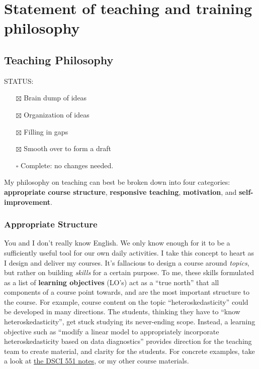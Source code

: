\documentclass[]{article}
\providecommand{\tightlist}{%
  \setlength{\itemsep}{0pt}\setlength{\parskip}{0pt}}
\begin{document}
\hypertarget{statement-of-teaching-and-training-philosophy}{%
\section{Statement of teaching and training philosophy}\label{statement-of-teaching-and-training-philosophy}}

\hypertarget{teaching-philosophy}{%
\subsection{Teaching Philosophy}\label{teaching-philosophy}}

STATUS:

\begin{itemize}
\tightlist
\item[$\boxtimes$]
  Brain dump of ideas
\item[$\boxtimes$]
  Organization of ideas
\item[$\boxtimes$]
  Filling in gaps
\item[$\boxtimes$]
  Smooth over to form a draft
\item[$\square$]
  Complete: no changes needed.
\end{itemize}

My philosophy on teaching can best be broken down into four categories: \textbf{appropriate course structure}, \textbf{responsive teaching}, \textbf{motivation}, and \textbf{self-improvement}.

\hypertarget{appropriate-structure}{%
\subsubsection{Appropriate Structure}\label{appropriate-structure}}

You and I don't really know English. We only know enough for it to be a sufficiently useful tool for our own daily activities. I take this concept to heart as I design and deliver my courses. It's fallacious to design a course around \emph{topics}, but rather on building \emph{skills} for a certain purpose. To me, these skills formulated as a list of \textbf{learning objectives} (LO's) act as a ``true north'' that all components of a course point towards, and are the most important structure to the course. For example, course content on the topic ``heteroskedasticity'' could be developed in many directions. The students, thinking they have to ``know heteroskedasticity'', get stuck studying its never-ending scope. Instead, a learning objective such as ``modify a linear model to appropriately incorporate heteroskedasticity based on data diagnostics'' provides direction for the teaching team to create material, and clarity for the students. For concrete examples, take a look at \href{https://ubc-mds.github.io/DSCI_551_stat-prob-dsci/lectures/}{the DSCI 551 notes}, or my other course materials.
\end{document}

